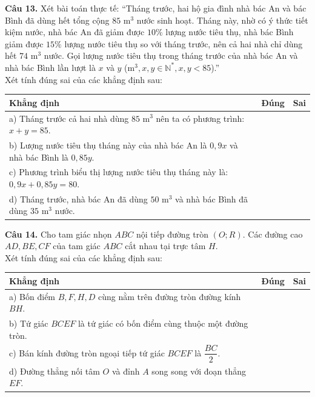 \documentclass[11pt,a4paper]{article}
\begin{document}
\vspace{1.5mm}
\textbf{Câu 13.} Xét bài toán thực tế: ``Tháng trước, hai hộ gia đình nhà bác An và bác Bình đã dùng hết tổng cộng $85\text{ m}^3$ nước sinh hoạt. Tháng này, nhờ có ý thức tiết kiệm nước, nhà bác An đã giảm được $10\%$ lượng nước tiêu thụ, nhà bác Bình giảm được $15\%$ lượng nước tiêu thụ so với tháng trước, nên cả hai nhà chỉ dùng hết $74\text{ m}^3$ nước. Gọi lượng nước tiêu thụ trong tháng trước của nhà bác An và nhà bác Bình lần lượt là $x$ và $y$ ($\text{m}^3, x, y \in \mathbb{N}^*, x, y < 85$).''\\
Xét tính đúng sai của các khẳng định sau:
\begin{center}
\begin{tabularx}{\linewidth}{|X|c|c|}
\hline
\textbf{Khẳng định} & \textbf{Đúng} & \textbf{Sai} \\
\hline
a) Tháng trước cả hai nhà dùng $85\text{ m}^3$ nên ta có phương trình: $x + y = 85$. & & \\
\hline
b) Lượng nước tiêu thụ tháng này của nhà bác An là $0{,}9x$ và nhà bác Bình là $0{,}85y$. & & \\
\hline
c) Phương trình biểu thị lượng nước tiêu thụ tháng này là: $0{,}9x + 0{,}85y = 80$. & & \\
\hline
d) Tháng trước, nhà bác An đã dùng $50\text{ m}^3$ và nhà bác Bình đã dùng $35\text{ m}^3$ nước. & & \\
\hline
\end{tabularx}
\end{center}

\vspace{2mm}
\textbf{Câu 14.} Cho tam giác nhọn $ABC$ nội tiếp đường tròn $(O; R)$. Các đường cao $AD, BE, CF$ của tam giác $ABC$ cắt nhau tại trực tâm $H$.\\
Xét tính đúng sai của các khẳng định sau:
\begin{center}
\begin{tabularx}{\linewidth}{|X|c|c|}
\hline
\textbf{Khẳng định} & \textbf{Đúng} & \textbf{Sai} \\
\hline
a) Bốn điểm $B, F, H, D$ cùng nằm trên đường tròn đường kính $BH$. & & \\
\hline
b) Tứ giác $BCEF$ là tứ giác có bốn điểm cùng thuộc một đường tròn. & & \\
\hline
c) Bán kính đường tròn ngoại tiếp tứ giác $BCEF$ là $\dfrac{BC}{2}$. & & \\
\hline
d) Đường thẳng nối tâm $O$ và đỉnh $A$ song song với đoạn thẳng $EF$. & & \\
\hline
\end{tabularx}
\end{center}
\end{document}
